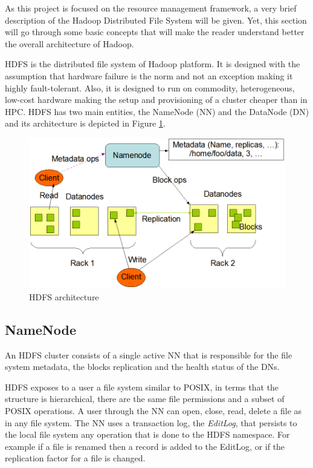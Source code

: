 As this project is focused on the resource management framework, a very
brief description of the Hadoop Distributed File
System will be given. Yet, this section will go through some basic concepts that will make the
reader understand better the overall architecture of Hadoop.

HDFS is the distributed file system of Hadoop platform. It is designed
with the assumption that hardware failure is the norm and not an
exception making it highly fault-tolerant. Also, it is designed to run
on commodity, heterogeneous, low-cost hardware making the setup and provisioning of
a cluster cheaper than in HPC. HDFS has two main entities, the NameNode
(NN) and the DataNode (DN) and its architecture is depicted in Figure
\ref{fig:hadoop_hdfs}.

\begin{figure}
\centering
\includegraphics[scale=0.5]{resources/images/Background/hdfs_arch.png}
\caption{HDFS architecture \cite{hdfs}}
\label{fig:hadoop_hdfs}
\end{figure}

\subsection{NameNode}
\label{ssec:nn}

An HDFS cluster consists of a single active NN that is responsible for the
file system metadata, the blocks replication and the health
status of the DNs.

HDFS exposes to a user a file system similar to POSIX, in terms that
the structure is hierarchical, there are the same file permissions 
and a subset of POSIX operations. A user through the NN can open,
close, read, delete a file as in any file system. The NN uses a transaction
log, the \emph{EditLog}, that persists to the local file system any
operation that is done to the HDFS namespace. For example if a file is
renamed then a record is added to the EditLog, or if the replication
factor for a file is changed.

